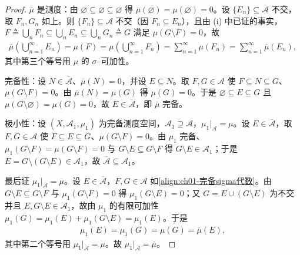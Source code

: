 \documentclass[../../main.tex]{subfiles}%
\begin{document}
\begin{proof}
$\overline{\mu}$ 是测度：由 $\varnothing \subseteq\varnothing \subseteq\varnothing$ 得 $\overline{\mu}(\varnothing )=\mu(\varnothing )=0$。设 $\{E_n\}\subseteq\overline{\mathcal{A}}$ 不交，取 $F_n,G_n$ 如上。则 $\{F_n\}\subseteq\mathcal{A}$ 不交（因 $F_n\subseteq E_n$），且由 (i) 中已证的事实，$F\triangleq\bigcup_nF_n\subseteq\bigcup_nE_n\subseteq\bigcup_nG_n\triangleq G$ 满足 $\mu(G\setminus F)=0$，故
\begin{align*}
\overline{\mu}\left(\bigcup_{n=1}^\infty E_n\right)=\mu(F)=\mu\left(\bigcup_{n=1}^\infty F_n\right)=\sum_{n=1}^\infty\mu(F_n)=\sum_{n=1}^\infty\overline{\mu}(E_n),
\end{align*}
其中第三个等号用 $\mu$ 的 $\sigma$--可加性。

完备性：设 $N\in\overline{\mathcal{A}}$、$\overline{\mu}(N)=0$，并设 $E\subseteq N$。取 $F,G\in\mathcal{A}$ 使 $F\subseteq N\subseteq G$、$\mu(G\setminus F)=0$。由 $\overline{\mu}(N)=\mu(G)$ 得 $\mu(G)=0$。于是 $\varnothing \subseteq E\subseteq G$ 且 $\mu(G\setminus\varnothing )=\mu(G)=0$，故 $E\in\overline{\mathcal{A}}$，即 $\overline{\mu}$ 完备。

极小性：设 $(X,\mathcal{A}_1,\mu_1)$ 为完备测度空间，$\mathcal{A}_1\supseteq\mathcal{A}$，$\mu_1|_{\mathcal{A}}=\mu$。设 $E\in\overline{\mathcal{A}}$，取 $F,G\in\mathcal{A}$ 使 $F\subseteq E\subseteq G$、$\mu(G\setminus F)=0$。由 $\mu_1$ 完备、$\mu_1(G\setminus F)=\mu(G\setminus F)=0$ 与 $G\setminus E\subseteq G\setminus F$ 得 $G\setminus E\in\mathcal{A}_1$；于是 $E=G\setminus(G\setminus E)\in\mathcal{A}_1$，故 $\overline{\mathcal{A}}\subseteq\mathcal{A}_1$。

最后证 $\mu_1|_{\overline{\mathcal{A}}}=\overline{\mu}$。设 $E\in\overline{\mathcal{A}}$，$F,G\in\mathcal{A}$ 如\eqref{align:ch01-完备sigma代数}。由 $G\setminus E\subseteq G\setminus F$ 与 $\mu_1(G\setminus F)=0$ 得 $\mu_1(G\setminus E)=0$；又 $G=E\cup(G\setminus E)$ 为不交并且 $E,G\setminus E\in\mathcal{A}_1$，故由 $\mu_1$ 的有限可加性 $\mu_1(G)=\mu_1(E)+\mu_1(G\setminus E)=\mu_1(E)$。于是
\begin{align*}
\mu_1(E)=\mu_1(G)=\mu(G)=\overline{\mu}(E),
\end{align*}
其中第二个等号用 $\mu_1|_{\mathcal{A}}=\mu$。故 $\mu_1|_{\overline{\mathcal{A}}}=\overline{\mu}$。
\end{proof}
\end{document}
